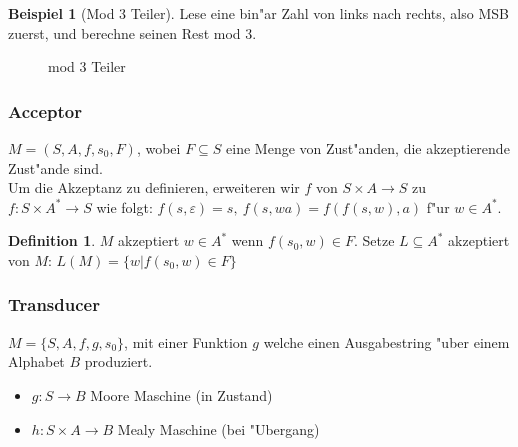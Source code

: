 \documentclass[german, 10pt, a4paper, twocolumn]{scrartcl}
\theoremstyle{definition}
\newtheorem*{definition}{Definition}
\theoremstyle{example}
\newtheorem{example}{Beispiel}[subsection]
\begin{document}
\begin{example}[Mod 3 Teiler]
Lese eine bin"ar Zahl von links nach rechts, also MSB zuerst, und berechne seinen Rest mod 3.

\begin{figure}[htb]
\begin{center}
\MediumPicture
{}
\end{center}
\caption{mod 3 Teiler}
\end{figure}
\end{example}


\subsubsection{Acceptor}

$M = (S, A, f, s_0, F)$, wobei $F\subseteq S$ eine Menge von Zust"anden, die akzeptierende Zust"ande sind.\\

Um die Akzeptanz zu definieren, erweiteren wir $f$ von $S\times A \to S$ zu $f: S\times A^* \to S$ wie folgt: $f(s,\varepsilon) = s,\: f(s, wa)=f(f(s,w),a)$ f"ur $w \in A^*$.

\begin{definition}
	$M$ akzeptiert $w \in A^*$ wenn $f(s_0,w) \in F$. Setze $L \subseteq A^*$ akzeptiert von $M$: $L(M) = \{ w | f(s_0, w) \in F \}$
\end{definition}

\subsubsection{Transducer}

$M=\{ S, A, f, g, s_0 \}$, mit einer Funktion $g$ welche einen Ausgabestring "uber einem Alphabet $B$ produziert.

\begin{itemize}
	\item $g: S \to B$ Moore Maschine (in Zustand)
	\item $h: S \times A \to B$ Mealy Maschine (bei "Ubergang)
\end{itemize}
\end{document}
